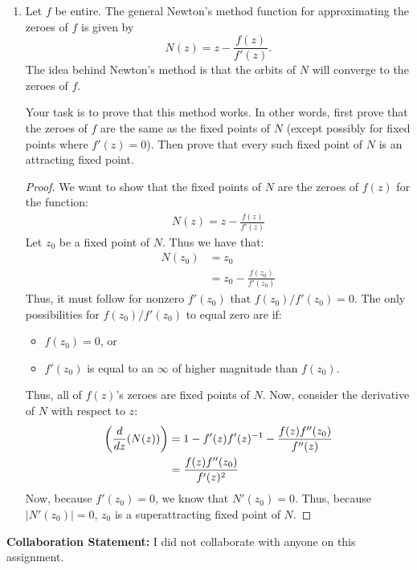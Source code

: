\begin{enumerate}
\begin{enumerate}
\begin{problem}
	\end{problem}
	\end{enumerate}
	
\item Let $f$ be entire. The general Newton's method function for approximating the zeroes of $f$ is given by
	\[N(z) = z- \frac{f(z)}{f'(z)}. \]
The idea behind Newton's method is that the orbits of $N$ will converge to the zeroes of $f$.

Your task is to prove that this method works. In other words, first prove that the zeroes of $f$ are the same as the fixed points of $N$ (except possibly for fixed points where $f'(z) =0$). Then prove that every such fixed point of $N$ is an attracting fixed point. 

\begin{proof}
	We want to show that the fixed points of $N$ are the zeroes of $f(z)$ for the function:
	\begin{align*}
		N(z) = z - \frac{f(z)}{f'(z)}
	\end{align*}
	Let $z_0$ be a fixed point of $N$. Thus we have that:
	\begin{align*}
		N(z_0) &= z_0\\
		&=z_0 - \frac{f(z_0)}{f'(z_0)}
	\end{align*}
	Thus, it must follow for nonzero $f'(z_0)$ that $f(z_0)/f'(z_0)= 0$. The only possibilities for $f(z_0)/f'(z_0)$ to equal zero are if:
	\begin{itemize}[itemsep=0pt, parsep=0pt]
		\item  $f(z_0) = 0$, or 
		\item $f'(z_0)$ is equal to an $\infty$ of higher magnitude than $f(z_0)$. 
	\end{itemize} 
	Thus, all of $f(z)$'s zeroes are fixed points of $N$. Now, consider the derivative of $N$ with respect to $z$:
	\begin{align*}
		\left(\frac{d}{dz}(N(z))\right)&= 1 - f'(z)f'(z)^{-1}-\frac{f(z)f''(z_0)}{f''(z)}\\
		&= \frac{f(z)f''(z_0)}{f'(z)^2}
	\end{align*}
	Now, because $f'(z_0)=0$, we know that $N'(z_0) = 0$. Thus, because $|N'(z_0)| = 0$, $z_0$ is a superattracting fixed point of $N$. 
\end{proof}

\end{enumerate}

\begin{reflection}
	\textbf{Collaboration Statement: }I did not collaborate with anyone on this assignment. 
\end{reflection}



